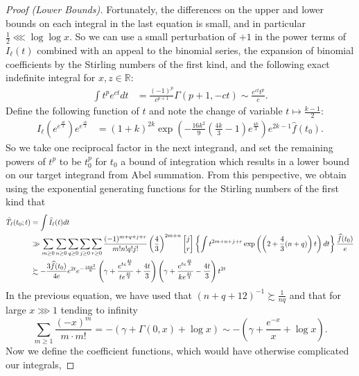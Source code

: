 \documentclass[11pt,reqno,a4letter]{article}
\numberwithin{figure}{section}
\numberwithin{table}{section}
\newcommand{\gkpSI}[2]{\ensuremath{\genfrac{\lbrack}{\rbrack}{0pt}{}{#1}{#2}}}
\theoremstyle{plain}
\numberwithin{theorem}{section}
\theoremstyle{definition}
\begin{document}
\begin{proof}[Proof (Lower Bounds)]
Fortunately, the 
differences on the upper and lower bounds on each integral in the last equation 
is small, and in particular $\frac{1}{2} \lll \log\log x$. 
So we can use a small perturbation of $+1$ in the power terms of $I_{\ell}(t)$ combined with 
an appeal to the binomial series, the expansion of binomial coefficients by the Stirling numbers 
of the first kind, and the following exact indefinite integral for $x,z \in \mathbb{R}$: 
\begin{align*} 
\int t^p e^{ct} dt & = \frac{(-1)^p}{c^{p+1}} \Gamma(p+1, -ct) \sim 
     \frac{e^{ct} t^p}{c}. 
\end{align*} 
Define the following function of $t$ and note the change of variable $t \mapsto \frac{k-1}{2}$: 
\begin{align*} 
I_{\ell}\left(e^{e^{\frac{4k}{3}}}\right) e^{e^{\frac{4k}{3}}} & = 
     (1+k)^{2k} \exp\left(-\frac{16k^2}{9} \left(\frac{4k}{3}-1\right) e^{\frac{4k}{3}}\right) 
     e^{2k-1} \widehat{f}(t_0). 
\end{align*} 
So we take one reciprocal factor in the next integrand, and set the remaining powers of $t^p$ to be 
$t_0^p$ for $t_0$ a bound of integration which results in a lower bound on our target integrand from 
Abel summation. From this perspective, we obtain using the exponential generating functions for the 
Stirling numbers of the first kind that \cite[\S 7.4]{GKP}
\begin{align*}
\widehat{T}_{\ell}(t_0; t) & = \int \widehat{I}_{\ell}(t) dt \\ 
     & \gg \sum_{m \geq 0} \sum_{n \geq 0} \sum_{q \geq 0} \sum_{j \geq 0} \sum_{r \geq 0} 
     \frac{(-1)^{m+q+j+r}}{m! n! q! j!} \left(\frac{4}{3}\right)^{2m+n} \gkpSI{j}{r} 
     \left\{\int 
     t^{2m+n+j+r} \exp\left(\left(2 + \frac{4}{3}(n+q)\right) t\right) dt 
     \right\} \frac{\widehat{f}(t_0)}{e} \\ 
     & \succsim 
     -\frac{3 \widehat{f}(t_0)}{4e} e^{2t} e^{-\frac{16 k^2}{9}} \left( 
     \gamma + \frac{e^{te^{\frac{4t}{3}}}}{t e^{\frac{4t}{3}}} + \frac{4t}{3}
     \right) \left(
     \gamma + \frac{e^{te^{\frac{4t}{3}}}}{k e^{\frac{4t}{3}}} - \frac{4t}{3} 
     \right) t^{2t} 
\end{align*} 
In the previous equation, we have used that $(n+q+12)^{-1} \succsim \frac{1}{nq}$ and that 
for large $x \ggg 1$ tending to infinity 
\[
\sum_{m \geq 1} \frac{(-x)^m}{m \cdot m!} = -\left(\gamma + \Gamma(0, x) + \log x\right) \sim 
     -\left(\gamma + \frac{e^{-x}}{x} + \log x\right). 
\]
Now we define the coefficient functions, which would have otherwise complicated our integrals, 

\end{proof}
\end{document}

